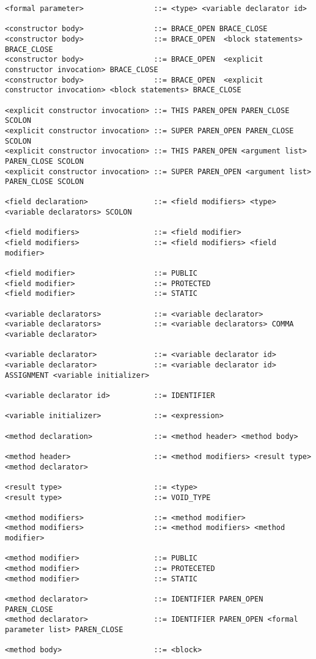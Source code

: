 \begin{lstlisting}
<formal parameter>                ::= <type> <variable declarator id>

<constructor body>                ::= BRACE_OPEN BRACE_CLOSE
<constructor body>                ::= BRACE_OPEN  <block statements>  BRACE_CLOSE
<constructor body>                ::= BRACE_OPEN  <explicit constructor invocation> BRACE_CLOSE
<constructor body>                ::= BRACE_OPEN  <explicit constructor invocation> <block statements> BRACE_CLOSE

<explicit constructor invocation> ::= THIS PAREN_OPEN PAREN_CLOSE SCOLON
<explicit constructor invocation> ::= SUPER PAREN_OPEN PAREN_CLOSE SCOLON
<explicit constructor invocation> ::= THIS PAREN_OPEN <argument list> PAREN_CLOSE SCOLON
<explicit constructor invocation> ::= SUPER PAREN_OPEN <argument list> PAREN_CLOSE SCOLON

<field declaration>               ::= <field modifiers> <type> <variable declarators> SCOLON

<field modifiers>                 ::= <field modifier>
<field modifiers>                 ::= <field modifiers> <field modifier>

<field modifier>                  ::= PUBLIC
<field modifier>                  ::= PROTECTED
<field modifier>                  ::= STATIC

<variable declarators>            ::= <variable declarator>
<variable declarators>            ::= <variable declarators> COMMA <variable declarator>

<variable declarator>             ::= <variable declarator id>
<variable declarator>             ::= <variable declarator id> ASSIGNMENT <variable initializer>

<variable declarator id>          ::= IDENTIFIER

<variable initializer>            ::= <expression>

<method declaration>              ::= <method header> <method body>

<method header>                   ::= <method modifiers> <result type> <method declarator>

<result type>                     ::= <type>
<result type>                     ::= VOID_TYPE

<method modifiers>                ::= <method modifier>
<method modifiers>                ::= <method modifiers> <method modifier>

<method modifier>                 ::= PUBLIC
<method modifier>                 ::= PROTECETED
<method modifier>                 ::= STATIC

<method declarator>               ::= IDENTIFIER PAREN_OPEN PAREN_CLOSE
<method declarator>               ::= IDENTIFIER PAREN_OPEN <formal parameter list> PAREN_CLOSE

<method body>                     ::= <block>
\end{lstlisting}

